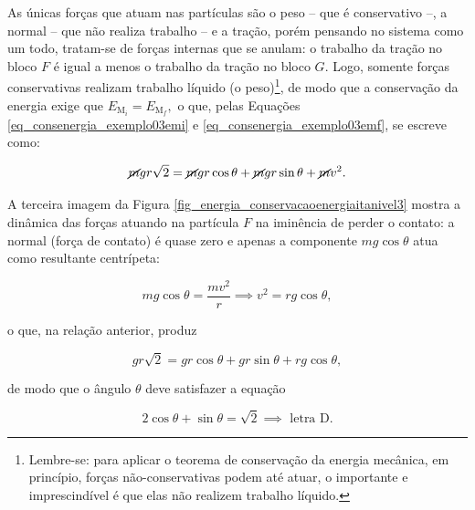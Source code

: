 \begin{exemplo}
As únicas forças que atuam nas partículas são o peso -- que é conservativo --, a normal -- que não realiza trabalho -- e a tração, porém pensando no sistema como um todo, tratam-se de forças internas que se anulam: o trabalho da tração no bloco $F$ é igual a menos o trabalho da tração no bloco $G$. Logo, somente forças conservativas realizam trabalho líquido (o peso)\footnote{Lembre-se: para aplicar o teorema de conservação da energia mecânica, em princípio, forças não-conservativas podem até atuar, o importante e imprescindível é que elas não realizem trabalho líquido.}, de modo que a conservação da energia exige que $E_{\text{M}_i}= E_{\text{M}_f},$ o que, pelas Equações \eqref{eq_consenergia_exemplo03emi} e \eqref{eq_consenergia_exemplo03emf}, se escreve como:

$$ \cancel mgr \sqrt 2 = \cancel mg r \cos \theta + \cancel mg r \sin \theta + \cancel mv^2.   $$

A terceira imagem da Figura \ref{fig_energia_conservacaoenergiaitanivel3} mostra a dinâmica das forças atuando na partícula $F$ na iminência de perder o contato: a normal (força de contato) é quase zero e apenas a componente $mg \cos \theta$ atua como resultante centrípeta:

$$ mg \cos \theta = \dfrac{mv^2}{r} \implies v^2 = rg \cos \theta, $$

\noindent o que, na relação anterior, produz

$$ gr \sqrt 2 = g r \cos \theta + g r \sin \theta + rg\cos \theta, $$

\noindent de modo que o ângulo $\theta$ deve satisfazer a equação

$$ \boxed{2 \cos \theta + \sin \theta = \sqrt 2 \implies \text{ letra D.}}$$

\end{exemplo}
\vspace{0.3cm}







